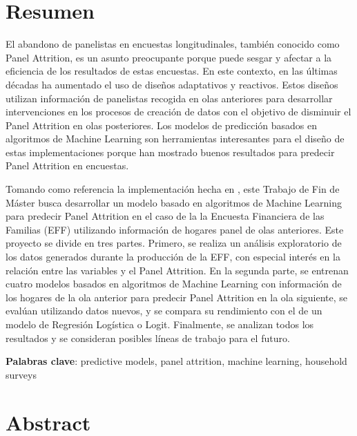 
\chapter*{Resumen}

\onehalfspacing

El abandono de panelistas en encuestas longitudinales, también conocido como Panel Attrition, es un asunto preocupante porque puede sesgar y afectar a la eficiencia de los resultados de estas encuestas. En este contexto, en las últimas décadas ha aumentado el uso de diseños adaptativos y reactivos. Estos diseños utilizan información de panelistas recogida en olas anteriores para desarrollar intervenciones en los procesos de creación de datos con el objetivo de disminuir el Panel Attrition en olas posteriores. Los modelos de predicción basados en algoritmos de Machine Learning son herramientas interesantes para el diseño de estas implementaciones porque han mostrado buenos resultados para predecir Panel Attrition en encuestas.

Tomando como referencia la implementación hecha en \cite{beste2023case}, este Trabajo de Fin de Máster busca desarrollar un modelo basado en algoritmos de Machine Learning para predecir Panel Attrition en el caso de la la Encuesta Financiera de las Familias (EFF) utilizando información de hogares panel de olas anteriores. Este proyecto se divide en tres partes. Primero, se realiza un análisis exploratorio de los datos generados durante la producción de la EFF, con especial interés en la relación entre las variables y el Panel Attrition. En la segunda parte, se entrenan cuatro modelos basados en algoritmos de Machine Learning con información de los hogares de la ola anterior para predecir Panel Attrition en la ola siguiente, se evalúan utilizando datos nuevos, y se compara su rendimiento con el de un modelo de Regresión Logística o Logit. Finalmente, se analizan todos los resultados y se consideran posibles líneas de trabajo para el futuro.

\vspace{1.5cm}

\textbf{Palabras clave}: predictive models, panel attrition, machine learning, household surveys

\chapter*{Abstract}

